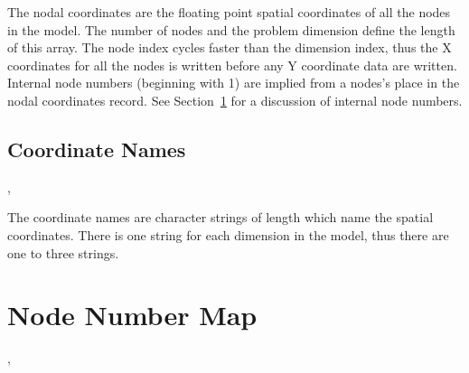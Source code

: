The nodal coordinates are the floating point spatial coordinates of
all the nodes in the model. The number of nodes and the problem
dimension define the length of this array. The node index cycles
faster than the dimension index, thus the X coordinates for all the
nodes is written before any Y coordinate data are written. Internal
node numbers (beginning with 1) are implied from a nodes's place in
the nodal coordinates record. See Section~\ref{s:nnm} for a discussion
of internal node numbers.

\subsection{Coordinate Names}

\begin{spacing}{1.5}
\api {}, 
\end{spacing}

The coordinate names are character strings of length
 which name the spatial coordinates. There is
one string for each dimension in the model, thus there are one to
three strings.


\section{Node Number Map}\label{s:nnm}

\begin{spacing}{1.5}
\api {}, 


\end{spacing}


